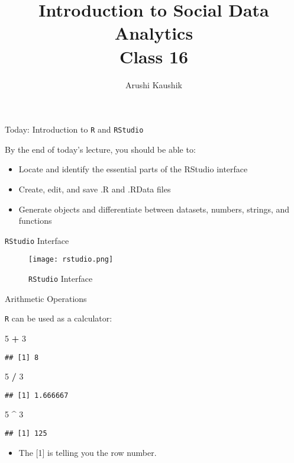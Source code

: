 \documentclass[ignorenonframetext,]{beamer}
\title[Class 16]{Introduction to Social Data Analytics\\
	Class 16}
\author{Arushi Kaushik}
\institute[UCSD]{arkaushi@ucsd.edu}
\newenvironment{Shaded}{\begin{snugshade}}{\end{snugshade}}
\newcommand{\DecValTok}[1]{\textcolor[rgb]{0.00,0.00,0.81}{#1}}
\newcommand{\StringTok}[1]{\textcolor[rgb]{0.31,0.60,0.02}{#1}}
\newcommand{\OperatorTok}[1]{\textcolor[rgb]{0.81,0.36,0.00}{\textbf{#1}}}
\providecommand{\tightlist}{%
	\setlength{\itemsep}{0pt}\setlength{\parskip}{0pt}}
\begin{document}
\frame{\titlepage}

\begin{frame}{Today: Introduction to \texttt{R} and \texttt{RStudio}}

By the end of today's lecture, you should be able to:

\begin{itemize}
\tightlist
\item
  Locate and identify the essential parts of the RStudio interface
\item
  Create, edit, and save .R and .RData files
\item
  Generate objects and differentiate between datasets, numbers, strings,
  and functions
\end{itemize}

\end{frame}

\begin{frame}[fragile]{\texttt{RStudio} Interface}

\begin{figure}
\centering
\texttt{[image: rstudio.png]}
\caption{\texttt{RStudio} Interface}
\end{figure}

\end{frame}

\begin{frame}[fragile]{Arithmetic Operations}

\texttt{R} can be used as a calculator:

\begin{Shaded}
\begin{Highlighting}[]
\DecValTok{5} \OperatorTok{+}\StringTok{ }\DecValTok{3}
\end{Highlighting}
\end{Shaded}

\begin{verbatim}
## [1] 8
\end{verbatim}

\begin{Shaded}
\begin{Highlighting}[]
\DecValTok{5} \OperatorTok{/}\StringTok{ }\DecValTok{3}
\end{Highlighting}
\end{Shaded}

\begin{verbatim}
## [1] 1.666667
\end{verbatim}

\begin{Shaded}
\begin{Highlighting}[]
\DecValTok{5} \OperatorTok{^}\StringTok{ }\DecValTok{3}
\end{Highlighting}
\end{Shaded}

\begin{verbatim}
## [1] 125
\end{verbatim}

\begin{itemize}
\tightlist
\item
  The {[}1{]} is telling you the row number.
\end{itemize}

\end{frame}
\end{document}
